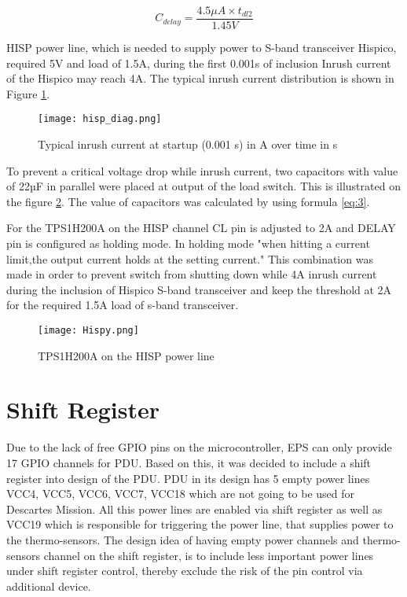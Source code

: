 \begin{equation} \label{eq: t2}
C_{delay} = \frac{4.5\mu A \times t_{dl2}}{1.45V} 
\end{equation}



 HISP power line, which is needed to supply power to S-band transceiver Hispico, required 5V and load of 1.5A, during the first 0.001s of inclusion Inrush current of the Hispico may reach 4A. The typical inrush current distribution is shown in Figure \ref{fig: hisp_inr}.

\begin{figure}[h]
	\centering
	\texttt{[image: hisp\_diag.png]}
	\caption{Typical inrush current at startup (0.001 s) in A over time in s}
	\label{fig: hisp_inr}
\end{figure} 

To prevent a critical voltage drop while inrush current, two capacitors with value of 22µF in parallel were placed at output of the load switch. This is illustrated on the figure \ref{fig: hispico}. The value of capacitors was calculated by using formula \ref{eq:3}.

For the TPS1H200A on the HISP channel CL pin is adjusted to 2A and DELAY pin is configured as holding mode. In holding mode \cite{28}"when hitting a current limit,the output current holds at the setting current." This combination was made in order to prevent switch from shutting down while 4A inrush current during the inclusion of Hispico S-band transceiver and keep the threshold at 2A for the required 1.5A load of s-band transceiver. 
 


\begin{figure}[h]
	\centering
	\texttt{[image: Hispy.png]}
	\caption{TPS1H200A on the HISP power line}
	\label{fig: hispico}
\end{figure}



 
\section{Shift Register}\label{shiftty}

Due to the lack of free GPIO pins on the microcontroller, EPS can only provide 17 GPIO channels for PDU. Based on this, it was decided to include a shift register into design of the PDU. PDU in its design has 5 empty power lines VCC4, VCC5, VCC6, VCC7, VCC18 which are not going to be used for Descartes Mission. All this power lines are enabled via shift register as well as VCC19 which is responsible for triggering the power line, that supplies power to the thermo-sensors. The design idea of having empty power channels and thermo-sensors channel on the shift register, is to include less important power lines under shift register control, thereby exclude the risk of the pin control via additional device. 


